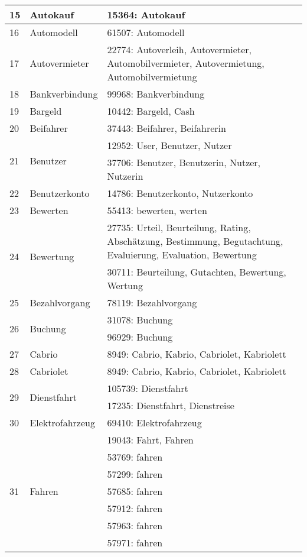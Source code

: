 \begin{longtable}{|m{1cm}|m{4.5cm}|m{7.5cm}|}
	\hline
	15 & Autokauf & 15364: Autokauf\\
	\hline
	16 & Automodell & 61507: Automodell\\
	\hline
	17 & Autovermieter & 22774: Autoverleih, Autovermieter, Automobilvermieter, Autovermietung, Automobilvermietung\\
	\hline
	18 & Bankverbindung & 99968: Bankverbindung\\
	\hline
	19 & Bargeld & 10442: Bargeld, Cash\\
	\hline
	20 & Beifahrer & 37443: Beifahrer, Beifahrerin\\
	\hline
	\multirow{2}{*}{21} & \multirow{2}{*}{Benutzer} & 12952: User, Benutzer, Nutzer\\
	& & 37706: Benutzer, Benutzerin, Nutzer, Nutzerin\\
	\hline
	22 & Benutzerkonto & 14786: Benutzerkonto, Nutzerkonto\\
	\hline
	23 & Bewerten & 55413: bewerten, werten\\
	\hline
	\multirow{2}{*}{24} & \multirow{2}{*}{Bewertung} & 27735: Urteil, Beurteilung, Rating, Abschätzung, Bestimmung, Begutachtung, Evaluierung, Evaluation, Bewertung\\
	& & 30711: Beurteilung, Gutachten, Bewertung, Wertung\\
	\hline
	25 & Bezahlvorgang & 78119: Bezahlvorgang\\
	\hline
	\multirow{2}{*}{26} & \multirow{2}{*}{Buchung} & 31078: Buchung\\
	& & 96929: Buchung\\
	\hline
	27 & Cabrio & 8949: Cabrio, Kabrio, Cabriolet, Kabriolett\\
	\hline
	28 & Cabriolet & 8949: Cabrio, Kabrio, Cabriolet, Kabriolett\\
	\hline
	\multirow{2}{*}{29} & \multirow{2}{*}{Dienstfahrt} & 105739: Dienstfahrt\\
	& & 17235: Dienstfahrt, Dienstreise\\
	\hline
	30 & Elektrofahrzeug & 69410: Elektrofahrzeug\\
	\hline
	\multirow{9}{*}{31} & \multirow{9}{*}{Fahren} & 19043: Fahrt, Fahren\\
	& & 53769: fahren\\
	\hline
	& & 57299: fahren\\
	\hline
	& & 57685: fahren\\
	\hline
	& & 57912: fahren\\
	\hline
	& & 57963: fahren\\
	\hline
	& & 57971: fahren\\

\end{longtable}
